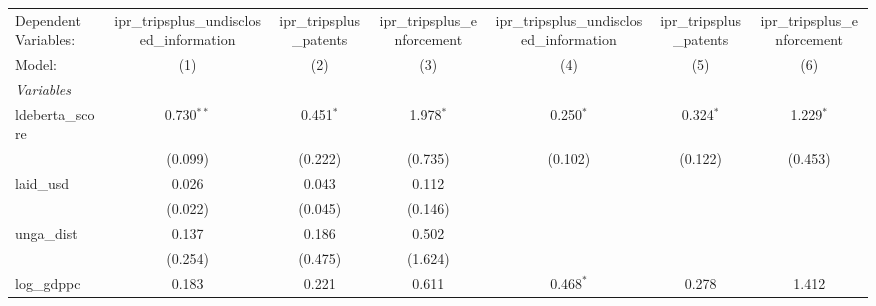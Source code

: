 
\begingroup
\centering
\begin{tabular}{lcccccc}
   \tabularnewline \midrule \midrule
   Dependent Variables:                   & ipr\_tripsplus\_undisclosed\_information    & ipr\_tripsplus\_patents   & ipr\_tripsplus\_enforcement   & ipr\_tripsplus\_undisclosed\_information    & ipr\_tripsplus\_patents   & ipr\_tripsplus\_enforcement\\    
   Model:                                 & (1)                                         & (2)                       & (3)                           & (4)                                         & (5)                       & (6)\\  
   \midrule
   \emph{Variables}\\
   ldeberta\_score                        & 0.730$^{**}$                                & 0.451$^{*}$               & 1.978$^{*}$                   & 0.250$^{*}$                                 & 0.324$^{*}$               & 1.229$^{*}$\\   
                                          & (0.099)                                     & (0.222)                   & (0.735)                       & (0.102)                                     & (0.122)                   & (0.453)\\   
   laid\_usd                              & 0.026                                       & 0.043                     & 0.112                         &                                             &                           &   \\   
                                          & (0.022)                                     & (0.045)                   & (0.146)                       &                                             &                           &   \\   
   unga\_dist                             & 0.137                                       & 0.186                     & 0.502                         &                                             &                           &   \\   
                                          & (0.254)                                     & (0.475)                   & (1.624)                       &                                             &                           &   \\   
   log\_gdppc                             & 0.183                                       & 0.221                     & 0.611                         & 0.468$^{*}$                                 & 0.278                     & 1.412\\   

\end{tabular}
